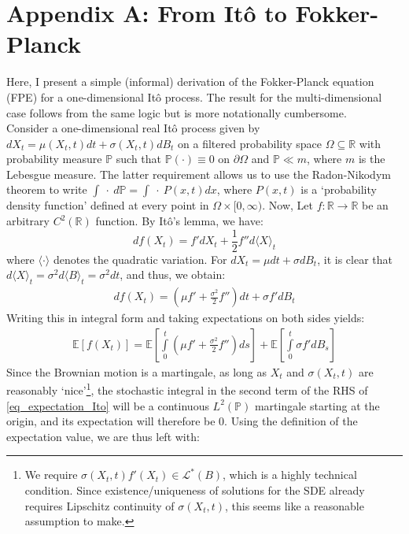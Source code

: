 \section*{Appendix A: From It\^{o} to Fokker-Planck}\label{sec_Ito_to_FPE}
Here, I present a simple (informal) derivation of the Fokker-Planck equation (FPE) for a one-dimensional It\^{o} process. The result for the multi-dimensional case follows from the same logic but is more notationally cumbersome.
\\
Consider a one-dimensional real It\^{o} process given by $dX_t = \mu(X_t,t)dt + \sigma(X_t,t)dB_t$ on a filtered probability space $\Omega \subseteq \mathbb{R}$ with probability measure $\mathbb{P}$ such that $\mathbb{P}(\cdot) \equiv 0$ on $\partial \Omega$ and $\mathbb{P} \ll m$, where $m$ is the Lebesgue measure. The latter requirement allows us to use the Radon-Nikodym theorem to write $\int \ \cdot \ d\mathbb{P} = \int \ \cdot \ P(x,t)dx$, where $P(x,t)$ is a `probability density function' defined at every point in $\Omega \times [0,\infty)$. Now, Let $f:\mathbb{R}\to\mathbb{R}$ be an arbitrary $C^2(\mathbb{R})$ function. By It\^{o}'s lemma, we have:
\begin{equation*}
    df(X_t) = f'dX_t + \frac{1}{2}f''d\langle X\rangle_t
\end{equation*}
where $\langle \cdot \rangle$ denotes the quadratic variation. For $dX_t = \mu dt + \sigma dB_t$, it is clear that $d\langle X\rangle_t = \sigma^2d\langle B\rangle_t = \sigma^2dt$, and thus, we obtain:
\begin{align*}
    df(X_t) = \left(\mu f' + \frac{\sigma^2}{2}f''\right)dt + \sigma f' dB_t
\end{align*}
Writing this in integral form and taking expectations on both sides yields:
\begin{align}
\label{eq_expectation_Ito}
    \mathbb{E}[f(X_t)] = \mathbb{E}\left[\int\limits_{0}^{t}\left(\mu f' + \frac{\sigma^2}{2}f''\right)ds\right] + \mathbb{E}\left[\int\limits_{0}^{t}\sigma f' dB_s\right]
\end{align}
Since the Brownian motion is a martingale, as long as $X_t$ and $\sigma(X_t,t)$ are reasonably `nice'\footnote{We require $\sigma(X_t,t)f'(X_t) \in \mathcal{L}^*(B)$, which is a highly technical condition. Since existence/uniqueness of solutions for the SDE already requires Lipschitz continuity of $\sigma(X_t,t)$, this seems like a reasonable assumption to make.}, the stochastic integral in the second term of the RHS of \eqref{eq_expectation_Ito} will be a continuous $L^2(\mathbb{P})$ martingale starting at the origin, and its expectation will therefore be 0. Using the definition of the expectation value, we are thus left with:
